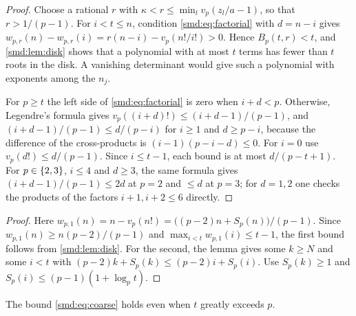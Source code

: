 \begin{proof}
Choose a rational $r$ with $\kappa<r\le\min_lv_p(z_l/a-1)$, so that $r>1/(p-1)$. For $i<t\le n$, condition \eqref{smd:eq:factorial} with $d=n-i$ gives
$w_{p,r}(n)-w_{p,r}(i)=r(n-i)-v_p(n!/i!)>0$. Hence $B_p(t,r)<t$, and
\cref{smd:lem:disk} shows that a polynomial with at most $t$ terms has fewer than $t$ roots
in the disk. A vanishing determinant would give such a polynomial with exponents among the
$n_j$.

For $p\ge t$ the left side of \eqref{smd:eq:factorial} is zero when $i+d<p$. Otherwise,
Legendre's formula gives $v_p((i+d)!)\le(i+d-1)/(p-1)$, and
$(i+d-1)/(p-1)\le d/(p-i)$ for $i\ge1$ and $d\ge p-i$, because the difference of the
cross-products is $(i-1)(p-i-d)\le0$. For $i=0$ use $v_p(d!)\le d/(p-1)$. Since
$i\le t-1$, each bound is at most $d/(p-t+1)$. For $p\in\{2,3\}$, $i\le4$ and $d\ge3$,
the same formula gives $(i+d-1)/(p-1)\le2d$ at $p=2$ and $\le d$ at $p=3$; for $d=1,2$
one checks the products of the factors $i+1,i+2\le6$ directly.
\end{proof}


\begin{proof}
Here $w_{p,1}(n)=n-v_p(n!)=\bigl((p-2)n+S_p(n)\bigr)/(p-1)$. Since
$w_{p,1}(n)\ge n(p-2)/(p-1)$ and $\max_{i<t}w_{p,1}(i)\le t-1$, the first bound follows
from \cref{smd:lem:disk}. For the second, the lemma gives some $k\ge N$ and some $i<t$ with
$(p-2)k+S_p(k)\le(p-2)i+S_p(i)$. Use $S_p(k)\ge1$ and
$S_p(i)\le(p-1)(1+\log_pt)$.
\end{proof}

The bound \eqref{smd:eq:coarse} holds even when $t$ greatly exceeds $p$.


